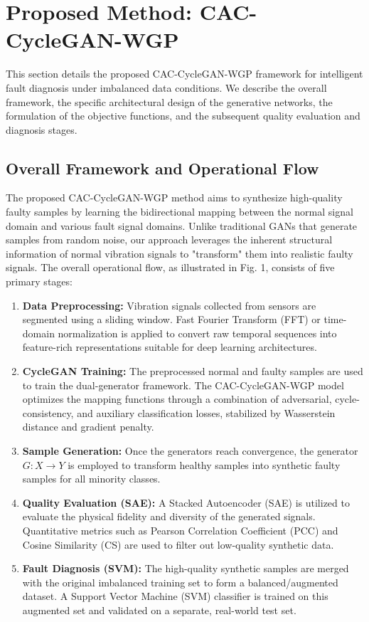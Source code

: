 \section{Proposed Method: CAC-CycleGAN-WGP}
\label{sec:proposed_method}

This section details the proposed CAC-CycleGAN-WGP framework for intelligent fault diagnosis under imbalanced data conditions. We describe the overall framework, the specific architectural design of the generative networks, the formulation of the objective functions, and the subsequent quality evaluation and diagnosis stages.

\subsection{Overall Framework and Operational Flow}
The proposed CAC-CycleGAN-WGP method aims to synthesize high-quality faulty samples by learning the bidirectional mapping between the normal signal domain and various fault signal domains. Unlike traditional GANs that generate samples from random noise, our approach leverages the inherent structural information of normal vibration signals to "transform" them into realistic faulty signals. The overall operational flow, as illustrated in Fig. 1, consists of five primary stages:

\begin{enumerate}
    \item \textbf{Data Preprocessing:} Vibration signals collected from sensors are segmented using a sliding window. Fast Fourier Transform (FFT) or time-domain normalization is applied to convert raw temporal sequences into feature-rich representations suitable for deep learning architectures.
    \item \textbf{CycleGAN Training:} The preprocessed normal and faulty samples are used to train the dual-generator framework. The CAC-CycleGAN-WGP model optimizes the mapping functions through a combination of adversarial, cycle-consistency, and auxiliary classification losses, stabilized by Wasserstein distance and gradient penalty.
    \item \textbf{Sample Generation:} Once the generators reach convergence, the generator $G: X \to Y$ is employed to transform healthy samples into synthetic faulty samples for all minority classes.
    \item \textbf{Quality Evaluation (SAE):} A Stacked Autoencoder (SAE) is utilized to evaluate the physical fidelity and diversity of the generated signals. Quantitative metrics such as Pearson Correlation Coefficient (PCC) and Cosine Similarity (CS) are used to filter out low-quality synthetic data.
    \item \textbf{Fault Diagnosis (SVM):} The high-quality synthetic samples are merged with the original imbalanced training set to form a balanced/augmented dataset. A Support Vector Machine (SVM) classifier is trained on this augmented set and validated on a separate, real-world test set.
\end{enumerate}

